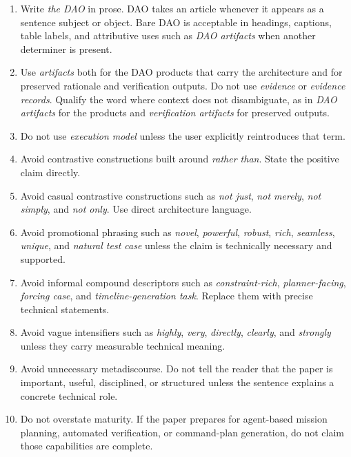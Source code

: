 \documentclass[11pt]{article}
\begin{document}
\begin{enumerate}
\item Write \emph{the DAO} in prose. DAO takes an article whenever it appears as a sentence subject or object. Bare DAO is acceptable in headings, captions, table labels, and attributive uses such as \emph{DAO artifacts} when another determiner is present.

\item Use \emph{artifacts} both for the DAO products that carry the architecture and for preserved rationale and verification outputs. Do not use \emph{evidence} or \emph{evidence records}. Qualify the word where context does not disambiguate, as in \emph{DAO artifacts} for the products and \emph{verification artifacts} for preserved outputs.

\item Do not use \emph{execution model} unless the user explicitly reintroduces that term.

\item Avoid contrastive constructions built around \emph{rather than}. State the positive claim directly.

\item Avoid casual contrastive constructions such as \emph{not just}, \emph{not merely}, \emph{not simply}, and \emph{not only}. Use direct architecture language.

\item Avoid promotional phrasing such as \emph{novel}, \emph{powerful}, \emph{robust}, \emph{rich}, \emph{seamless}, \emph{unique}, and \emph{natural test case} unless the claim is technically necessary and supported.

\item Avoid informal compound descriptors such as \emph{constraint-rich}, \emph{planner-facing}, \emph{forcing case}, and \emph{timeline-generation task}. Replace them with precise technical statements.

\item Avoid vague intensifiers such as \emph{highly}, \emph{very}, \emph{directly}, \emph{clearly}, and \emph{strongly} unless they carry measurable technical meaning.

\item Avoid unnecessary metadiscourse. Do not tell the reader that the paper is important, useful, disciplined, or structured unless the sentence explains a concrete technical role.

\item Do not overstate maturity. If the paper prepares for agent-based mission planning, automated verification, or command-plan generation, do not claim those capabilities are complete.


\end{enumerate}
\end{document}
